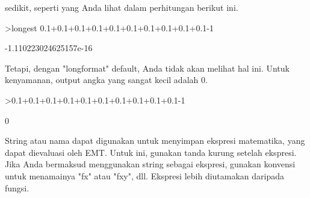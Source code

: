 \documentclass[a4paper,10pt]{article}
\begin{document}
\begin{eulernotebook}
\begin{eulercomment}
sedikit, seperti yang Anda lihat dalam perhitungan berikut ini.
\end{eulercomment}
\begin{eulerprompt}
>longest 0.1+0.1+0.1+0.1+0.1+0.1+0.1+0.1+0.1+0.1-1
\end{eulerprompt}
\begin{euleroutput}
   -1.110223024625157e-16 
\end{euleroutput}
\begin{eulercomment}
Tetapi, dengan "longformat" default, Anda tidak akan melihat hal ini.
Untuk kenyamanan, output angka yang sangat kecil adalah 0.
\end{eulercomment}
\begin{eulerprompt}
>0.1+0.1+0.1+0.1+0.1+0.1+0.1+0.1+0.1+0.1-1
\end{eulerprompt}
\begin{euleroutput}
  0
\end{euleroutput}
\begin{eulercomment}
String atau nama dapat digunakan untuk menyimpan ekspresi matematika,
yang dapat dievaluasi oleh EMT. Untuk ini, gunakan tanda kurung
setelah ekspresi. Jika Anda bermaksud menggunakan string sebagai
ekspresi, gunakan konvensi untuk menamainya "fx" atau "fxy", dll.
Ekspresi lebih diutamakan daripada fungsi.


\end{eulercomment}
\end{eulernotebook}
\end{document}
